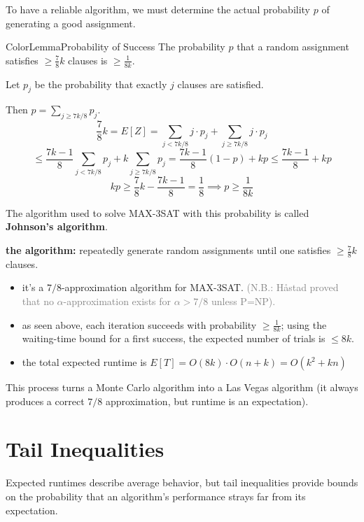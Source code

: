 \documentclass[a4paper, 11pt]{report}
\begin{document}
To have a reliable algorithm, we must determine the actual probability $p$ of generating a good assignment.

\begin{cframe}{ColorLemma}{Probability of Success}
    The probability $p$ that a random assignment satisfies $\ge \frac{7}{8}k$ clauses is $\ge \frac{1}{8k}$.
\end{cframe}
    
\begin{proofframe}{}{}
Let $p_j$ be the probability that exactly $j$ clauses are satisfied. 

Then $p = \sum_{j \ge 7k/8} p_j$.
    $$\frac{7}{8}k = E[Z] = \sum_{j < 7k/8} j \cdot p_j + \sum_{j \ge 7k/8} j \cdot p_j$$
    $$\le \frac{7k-1}{8} \sum_{j < 7k/8} p_j + k \sum_{j \ge 7k/8} p_j = \frac{7k-1}{8}(1-p) + kp \le \frac{7k-1}{8} + kp$$
    $$kp \ge \frac{7}{8}k - \frac{7k-1}{8} = \frac{1}{8} \implies p \ge \frac{1}{8k}$$
\end{proofframe}

The algorithm used to solve MAX-3SAT with this probability is called \textbf{Johnson's algorithm}.

    \textbf{the algorithm:} repeatedly generate random assignments until one satisfies $\ge \frac{7}{8}k$ clauses.
    \begin{itemize}
        \item it's a $7/8$-approximation algorithm for MAX-3SAT. \textcolor{gray}{(N.B.: Håstad proved that no $\alpha$-approximation exists for $\alpha > 7/8$ unless P=NP).}
        \item as seen above, each iteration succeeds with probability $\ge \frac{1}{8k}$; using the waiting-time bound for a first success, the expected number of trials is $\le 8k$.
        \item the total expected runtime is $E[T] = O(8k) \cdot O(n+k) = O(k^2 + kn)$
    \end{itemize}
    
\begin{gframe}{}
    This process turns a Monte Carlo algorithm into a Las Vegas algorithm (it always produces a correct $7/8$ approximation, but runtime is an expectation).
\end{gframe}

\section{Tail Inequalities}

Expected runtimes describe average behavior, but tail inequalities provide bounds on the probability that an algorithm's performance strays far from its expectation.
\end{document}
